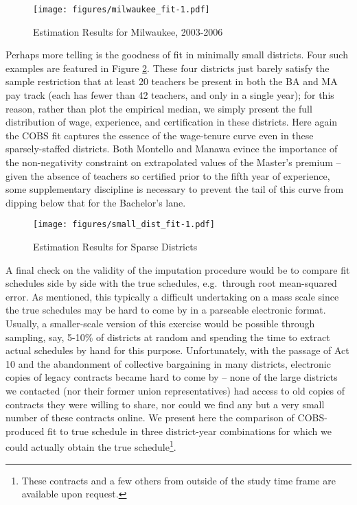 \begin{figure}[htbp]
\centering
\texttt{[image: figures/milwaukee\_fit-1.pdf]}
\caption{\label{fig:mwk_fit}Estimation Results for Milwaukee, 2003-2006}
\end{figure}

Perhaps more telling is the goodness of fit in minimally small
districts. Four such examples are featured in Figure
\ref{fig:small_fit}. These four districts just barely satisfy the sample
restriction that at least 20 teachers be present in both the BA and MA
pay track (each has fewer than 42 teachers, and only in a single year);
for this reason, rather than plot the empirical median, we simply
present the full distribution of wage, experience, and certification in
these districts. Here again the COBS fit captures the essence of the
wage-tenure curve even in these sparsely-staffed districts. Both
Montello and Manawa evince the importance of the non-negativity
constraint on extrapolated values of the Master's premium -- given the
absence of teachers so certified prior to the fifth year of experience,
some supplementary discipline is necessary to prevent the tail of this
curve from dipping below that for the Bachelor's lane.

\begin{figure}[htbp]
\centering
\texttt{[image: figures/small\_dist\_fit-1.pdf]}
\caption{\label{fig:small_fit}Estimation Results for Sparse Districts}
\end{figure}

A final check on the validity of the imputation procedure would be to
compare fit schedules side by side with the true schedules, e.g.~through
root mean-squared error. As mentioned, this typically a difficult
undertaking on a mass scale since the true schedules may be hard to come
by in a parseable electronic format. Usually, a smaller-scale version of
this exercise would be possible through sampling, say, 5-10\% of
districts at random and spending the time to extract actual schedules by
hand for this purpose. Unfortunately, with the passage of Act 10 and the
abandonment of collective bargaining in many districts, electronic
copies of legacy contracts became hard to come by -- none of the large
districts we contacted (nor their former union representatives) had
access to old copies of contracts they were willing to share, nor could
we find any but a very small number of these contracts online. We
present here the comparison of COBS-produced fit to true schedule in
three district-year combinations for which we could actually obtain the
true schedule\footnote{These contracts and a few others from outside of
  the study time frame are available upon request.}.

